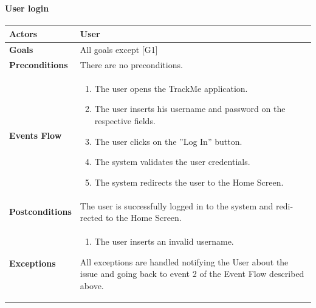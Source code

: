 \documentclass[12pt]{article}
\begin{document}
\paragraph{User login}
\begin{center}
    \begin{tabular} { |p{}|p{}| }
         \hline
         \textbf{Actors} & User \\ 
         \hline
         \textbf{Goals} & All goals except [G1] \\ 
         \hline  
         \textbf{Preconditions} & There are no preconditions. \\ 
         \hline
         \textbf{Events Flow} & \begin{enumerate}[topsep=0pt]
             \setlength{\itemsep}{0.5pt}
             \item The user opens the TrackMe application.
             \item The user inserts his username and password on the respective fields.
             \item The user clicks on the ”Log In” button.
             \item The system validates the user credentials.
             \item The system redirects the user to the Home Screen.
             \end{enumerate} \\ 
        \hline
        \textbf{Postconditions} & The user is successfully logged in to the system and redi- rected to the Home Screen. \\
        \hline 
        \textbf{Exceptions} & \begin{enumerate}[topsep=0pt] 
              \setlength{\itemsep}{0.5pt}
              \item The user inserts an invalid username.
              \end{enumerate}
              All exceptions are handled notifying the User about the issue and going back to event 2 of the Event Flow described above.\\ 
        \hline
    \end{tabular}
\end{center}



\newpage
\end{document}
